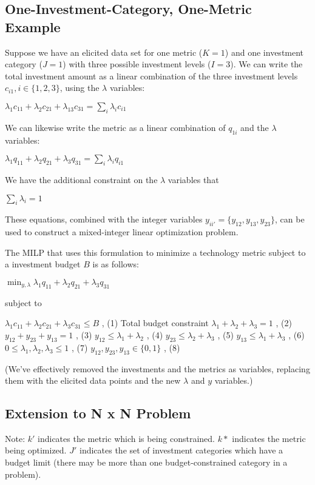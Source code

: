 \documentclass[letterpaper,10pt,english]{sphinxmanual}
\begin{document}
\subsection{One-Investment-Category, One-Metric Example}
\label{\detokenize{optimizers:one-investment-category-one-metric-example}}
Suppose we have an elicited data set for one metric (\(K = 1\)) and one investment category (\(J = 1\)) with three possible investment levels (\(I = 3\)). We can write the total investment amount as a linear combination of the three investment levels \(c_{i1}, i \in \{1, 2, 3\}\), using the \(\lambda\) variables:

\(\lambda_{1}c_{11} + \lambda_{2}c_{21} + \lambda_{13}c_{31} = \sum_{i} \lambda_{i}c_{i1}\)

We can likewise write the metric as a linear combination of \(q_{1i}\) and the \(\lambda\) variables:

\(\lambda_{1}q_{11} + \lambda_{2}q_{21} + \lambda_{3}q_{31} = \sum_{i} \lambda_{i}q_{i1}\)

We have the additional constraint on the \(\lambda\) variables that

\(\sum_{i} \lambda_{i} = 1\)

These equations, combined with the integer variables \(y_{ii'} = \{ y_{12}, y_{13}, y_{23} \}\), can be used to construct a mixed-integer linear optimization problem.

The MILP that uses this formulation to minimize a technology metric subject to a investment budget \(B\) is as follows:

\(\min_{y, \lambda} \lambda_{1}q_{11} + \lambda_{2}q_{21} + \lambda_{3}q_{31}\)

subject to

\(\lambda_{1}c_{11} + \lambda_{2}c_{21} + \lambda_{3}c_{31} \leq B\) , (1) Total budget constraint
\(\lambda_1 + \lambda_2 + \lambda_3 = 1\) , (2)
\(y_{12} + y_{23} + y_{13} = 1\) , (3)
\(y_{12} \leq \lambda_1 + \lambda_2\) , (4)
\(y_{23} \leq \lambda_2 + \lambda_3\) , (5)
\(y_{13} \leq \lambda_1 + \lambda_3\) , (6)
\(0 \leq \lambda_1, \lambda_2, \lambda_3 \leq 1\) , (7)
\(y_{12}, y_{23}, y_{13} \in \{ 0, 1 \}\) , (8)

(We’ve effectively removed the investments and the metrics as variables, replacing them with the elicited data points and the new \(\lambda\) and \(y\) variables.)


\subsection{Extension to N x N Problem}
\label{\detokenize{optimizers:extension-to-n-x-n-problem}}
Note: \(k'\) indicates the metric which is being constrained. \(k*\) indicates the metric being optimized. \(J'\) indicates the set of investment categories which have a budget limit (there may be more than one budget-constrained category in a problem).
\end{document}
